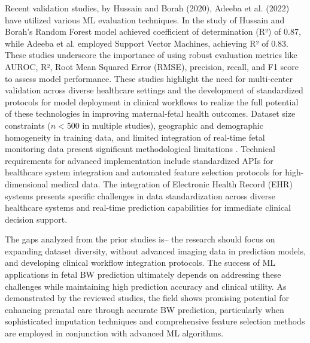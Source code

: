 Recent validation studies, by Hussain and Borah (2020), Adeeba et al. (2022) have utilized various ML evaluation techniques. In the study of Hussain and Borah's Random Forest model achieved coefficient of determination (R²) of 0.87, while Adeeba et al. employed Support Vector Machines, achieving R² of 0.83. These studies underscore the importance of using robust evaluation metrics like AUROC, R², Root Mean Squared Error (RMSE), precision, recall, and F1 score to assess model performance\cite{19A}. These studies highlight the need for multi-center validation across diverse healthcare settings and the development of standardized protocols for model deployment in clinical workflows to realize the full potential of these technologies in improving maternal-fetal health outcomes. Dataset size constraints ($n<500$ in multiple studies), geographic and demographic homogeneity in training data, and limited integration of real-time fetal monitoring data present significant methodological limitations \cite{20A}. Technical requirements for advanced implementation include standardized APIs for healthcare system integration and automated feature selection protocols for high-dimensional medical data. The integration of Electronic Health Record (EHR) systems presents specific challenges in data standardization across diverse healthcare systems and real-time prediction capabilities for immediate clinical decision support\cite{21A}. 

The gaps analyzed from the prior studies is– the research should focus on expanding dataset diversity, without advanced imaging data in prediction models, and developing clinical workflow integration protocols. The success of ML applications in fetal BW prediction ultimately depends on addressing these challenges while maintaining high prediction accuracy and clinical utility. As demonstrated by the reviewed studies, the field shows promising potential for enhancing prenatal care through accurate BW prediction, particularly when sophisticated imputation techniques and comprehensive feature selection methods are employed in conjunction with advanced ML algorithms.
